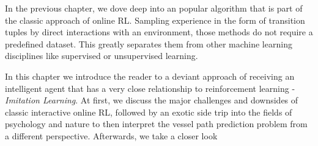 In the previous chapter, we dove deep into an popular algorithm that is part of the classic approach of online RL. Sampling experience in the form of transition tuples by direct interactions with an environment, those methods do not require a predefined dataset. This greatly separates them from other machine learning disciplines like supervised or unsupervised learning.
\par 
In this chapter we introduce the reader to a deviant approach of receiving an intelligent agent that has a very close relationship to reinforcement learning - \textit{Imitation Learning}. At first, we discuss the major challenges and downsides of classic interactive online RL, followed by an exotic side trip into the fields of psychology and nature to then interpret the vessel path prediction problem from a different perspective. Afterwards, we take a closer look 